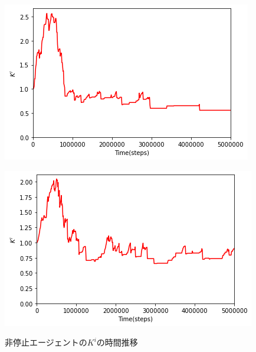 \documentclass[12pt,a4j,twoside]{jarticle}
\begin{document}
\begin{figure}
\begin{minipage}{0.48\hsize}
      \includegraphics[width=0.99\hsize]{figures/CorrectionTransition_CountStop_2.png}
      \label{subfig:transition_2}
    \end{minipage}
    \hfill
    \begin{minipage}{0.48\hsize}
      \centering
      \includegraphics[width=0.99\hsize]{figures/CorrectionTransition_CountStop_9.png}
      \label{subfig:transition_9}
    \end{minipage}
    \caption{非停止エージェントの$K^i$の時間推移}
    \label{fig:transition_notSuspend}
  \end{figure}
\end{document}
